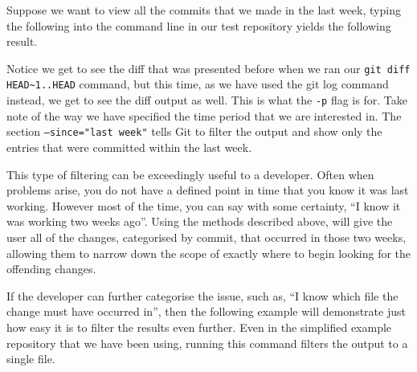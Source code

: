 Suppose we want to view all the commits that we made in the last week, typing the following into the command line in our test repository yields the following result.


Notice we get to see the diff that was presented before when we ran our \texttt{git diff HEAD\textasciitilde1..HEAD} command, but this time, as we have used the git log command instead, we get to see the diff output as well.
This is what the \texttt{-p} flag is for.
Take note of the way we have specified the time period that we are interested in.
The section \texttt{--since="last week"} tells Git to filter the output and show only the entries that were committed within the last week.

This type of filtering can be exceedingly useful to a developer.
Often when problems arise, you do not have a defined point in time that you know it was last working.
However most of the time, you can say with some certainty, ``I know it was working two weeks ago''.
Using the methods described above, will give the user all of the changes, categorised by commit, that occurred in those two weeks, allowing them to narrow down the scope of exactly where to begin looking for the offending changes.

If the developer can further categorise the issue, such as, ``I know which file the change must have occurred in'', then the following example will demonstrate just how easy it is to filter the results even further.
Even in the simplified example repository that we have been using, running this command filters the output to a single file.

